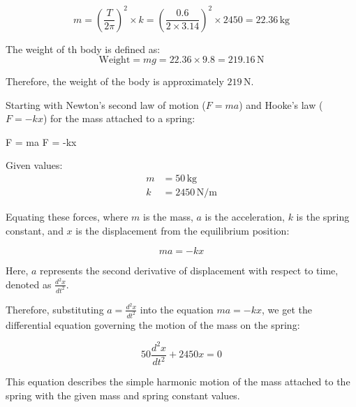 \documentclass[journal,12pt,twocolumn]{IEEEtran}
\theoremstyle{remark}
\begin{document}
\begin{equation}
m = \left(\frac{T}{2\pi}\right)^2 \times k = \left(\frac{0.6}{2 \times 3.14}\right)^2 \times 2450 = 22.36 \, \text{kg}
\end{equation}

The weight of th body is defined as:
\begin{equation}
\text{Weight} = mg = 22.36 \times 9.8 = 219.16 \, \text{N}
\end{equation}

Therefore, the weight of the body is approximately \(219 \, \text{N}\).
	
	\vspace{2cm}

	Starting with Newton's second law of motion ($F = ma$) and Hooke's law ($F = -kx$) for the mass attached to a spring:


     F = ma \quad {} \quad {} F = -kx


Given values:
\begin{align*}
    m &= 50 \, \text{kg} \\
    k &= 2450 \, \text{N/m}
\end{align*}

Equating these forces, where $m$ is the mass, $a$ is the acceleration, $k$ is the spring constant, and $x$ is the displacement from the equilibrium position:

\begin{equation}
    ma = -kx
\end{equation}

Here, $a$ represents the second derivative of displacement with respect to time, denoted as $\frac{d^2x}{dt^2}$.

Therefore, substituting $a = \frac{d^2x}{dt^2}$ into the equation $ma = -kx$, we get the differential equation governing the motion of the mass on the spring:

\begin{equation}
    50 \frac{d^2x}{dt^2} + 2450x = 0
\end{equation}

This equation describes the simple harmonic motion of the mass attached to the spring with the given mass and spring constant values.	
\end{document}
